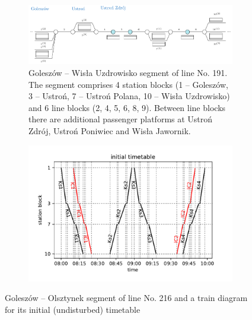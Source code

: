 \begin{figure}
  \begin{subfigure}{\textwidth}
    \includegraphics[width=\textwidth]{figures/line.pdf}
    \caption{Goleszów -- Wisła Uzdrowisko segment of line No. 191. The segment comprises 4
      station blocks (1 -- Goleszów, 3 -- Ustroń, 7 -- Ustroń Polana, 10 -- Wisła
      Uzdrowisko) and 6 line blocks (2, 4, 5, 6, 8, 9). Between line blocks there are
      additional passenger platforms at Ustroń Zdrój, Ustroń Poniwiec and Wisła
      Jawornik. } \label{fig:line}
  \end{subfigure}
  \begin{subfigure}{\textwidth}
    \includegraphics[width=\textwidth]{figures/train_diagram}
    \label{fig:diagram}
  \end{subfigure}
  \caption{Goleszów -- Olsztynek segment of line No. 216 and a train diagram for its
    initial (undisturbed) timetable}
\end{figure}

